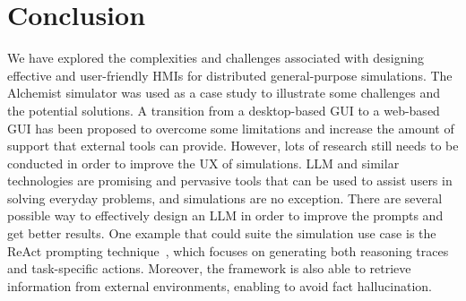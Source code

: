 \documentclass[conference]{IEEEtran}
\begin{document}
\section{Conclusion}
We have explored the complexities and challenges associated with designing effective and user-friendly \acp{HMI} for distributed general-purpose simulations.
%
The Alchemist simulator was used as a case study to illustrate some challenges and the potential solutions.
%
A transition from a desktop-based \ac{GUI} to a web-based \ac{GUI} has been proposed to overcome some limitations and increase the amount of support that external tools can provide.
%
However,
lots of research still needs to be conducted in order to improve the \ac{UX} of simulations.
%
\ac{LLM} and similar technologies are promising and pervasive tools that can be used to assist users in solving everyday problems,
and simulations are no exception.
%
There are several possible way to effectively design an \ac{LLM} in order to improve the prompts and get better results.
%
One example that could suite the simulation use case is the ReAct prompting technique~\cite{DBLP:conf/iclr/YaoZYDSN023},
which focuses on generating both reasoning traces and task-specific actions.
%
Moreover,
the framework is also able to retrieve information from external environments,
enabling to avoid fact hallucination.
%



\vspace{12pt}
\end{document}
